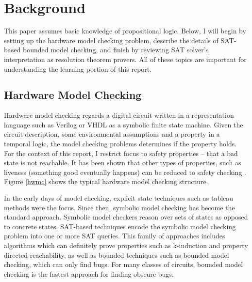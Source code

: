 \documentclass[letterpaper]{article} %
\begin{document}
\section{Background}
This paper assumes basic knowledge of propositional logic. Below, I will begin by setting up the hardware model checking problem, describe the details of SAT-based bounded model checking, and finish by reviewing SAT solver's interpretation as resolution theorem provers. All of these topics are important for understanding the learning portion of this report.

\subsection{Hardware Model Checking}
Hardware model checking regards a digital circuit written in a representation language such as Verilog or VHDL as a symbolic finite state machine. Given the circuit description, some environmental assumptions and a property in a temporal logic, the model checking problems determines if the property holds. For the context of this report, I restrict focus to safety properties -- that a bad state is not reachable. It has been shown that other types of properties, such as liveness (something good eventually happens) can be reduced to safety checking \cite{biere}. Figure \ref{hwmc} shows the typical hardware model checking structure.

In the early days of model checking, explicit state techniques such as tableau methods were the focus. Since then, symbolic model checking has become the standard approach. Symbolic model checkers reason over sets of states as opposed to concrete states. SAT-based techniques encode the symbolic model checking problem into one or more SAT queries. This family of approaches includes algorithms which can definitely prove properties such as k-induction and property directed reachability, as well as bounded techniques such as bounded model checking, which can only find bugs. For many classes of circuits, bounded model checking is the fastest approach for finding obscure bugs.
\end{document}
